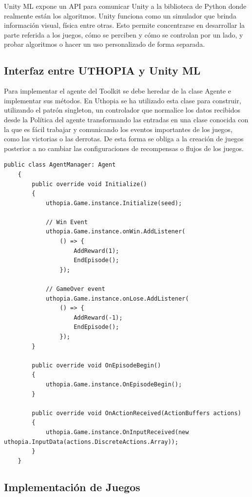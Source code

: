 Unity ML expone un API para comunicar Unity a la biblioteca de Python donde realmente están los algoritmos. Unity funciona como un simulador que brinda información visual, física entre otras. Esto permite concentrarse en desarrollar la parte referida a los juegos, cómo se perciben y cómo se controlan por un lado, y probar algoritmos o hacer un uso personalizado de forma separada.
 
\subsection{Interfaz entre UTHOPIA y Unity ML}
 
Para implementar el agente del Toolkit se debe heredar de la clase Agente e implementar sus métodos. En Uthopia se ha utilizado esta clase para construir, utilizando el patrón singleton, un controlador que normalice los datos recibidos desde la Política del agente transformando las entradas en una clase conocida con la que es fácil trabajar y comunicando los eventos importantes de los juegos, como las victorias o las derrotas. De esta forma se obliga a la creación de juegos posterior a no cambiar las configuraciones de recompensas o flujos de los juegos.
 
\begin{lstlisting}[caption={Implementación de la clase AgentManager la cual conecta a los agentes de Unity ML Toolkit con los juegos de UTHOPIA}]
    public class AgentManager: Agent
    {
        public override void Initialize()
        {
            uthopia.Game.instance.Initialize(seed);
 
            // Win Event
            uthopia.Game.instance.onWin.AddListener(
                () => { 
                    AddReward(1); 
                    EndEpisode();
                });
 
            // GameOver event
            uthopia.Game.instance.onLose.AddListener(
                () => { 
                    AddReward(-1); 
                    EndEpisode(); 
                });
        }
 
        public override void OnEpisodeBegin()
        {
            uthopia.Game.instance.OnEpisodeBegin();
        }
 
        public override void OnActionReceived(ActionBuffers actions)
        {
            uthopia.Game.instance.OnInputReceived(new uthopia.InputData(actions.DiscreteActions.Array));
        }
    }
\end{lstlisting}

\subsection{Implementación de Juegos}
 
